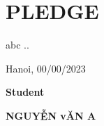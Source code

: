 \section*{PLEDGE}
\thispagestyle{empty}
abc ..

\vspace{6pt}
\hspace{7cm}Hanoi, 00/00/2023

\hspace{9cm}\textbf{Student}

\vspace{2cm}
\hspace{8.3cm}\textbf{NGUYỄN vĂN A}
\cleardoublepage